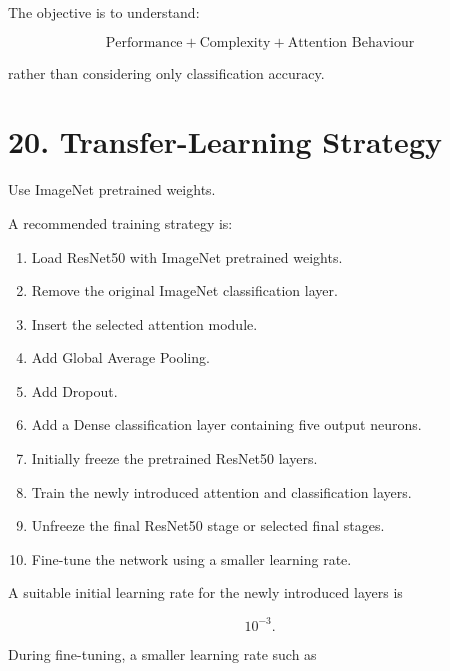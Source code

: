 \documentclass[10pt]{article}
\begin{document}
The objective is to understand:

\[
\boxed{
\text{Performance}
+
\text{Complexity}
+
\text{Attention Behaviour}
}
\]

rather than considering only classification accuracy.

\section*{20. Transfer-Learning Strategy}

Use ImageNet pretrained weights.

A recommended training strategy is:

\begin{enumerate}

\item Load ResNet50 with ImageNet pretrained weights.

\item Remove the original ImageNet classification layer.

\item Insert the selected attention module.

\item Add Global Average Pooling.

\item Add Dropout.

\item Add a Dense classification layer containing five output neurons.

\item Initially freeze the pretrained ResNet50 layers.

\item Train the newly introduced attention and classification layers.

\item Unfreeze the final ResNet50 stage or selected final stages.

\item Fine-tune the network using a smaller learning rate.

\end{enumerate}

A suitable initial learning rate for the newly introduced layers is

\[
10^{-3}.
\]

During fine-tuning, a smaller learning rate such as
\end{document}
